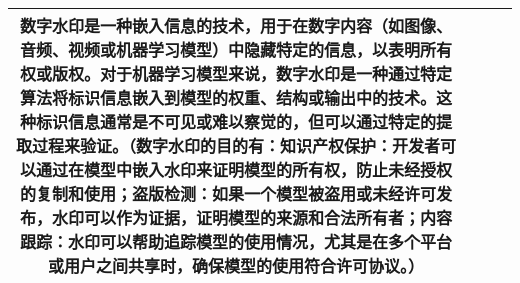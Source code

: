 \documentclass[lettersize,journal]{IEEEtran}
\begin{document}
\begin{longtable}{|c|p{3cm}|c|p{12cm}|}
   数字水印是一种嵌入信息的技术，用于在数字内容（如图像、音频、视频或机器学习模型）中隐藏特定的信息，以表明所有权或版权。对于机器学习模型来说，数字水印是一种通过特定算法将标识信息嵌入到模型的权重、结构或输出中的技术。这种标识信息通常是不可见或难以察觉的，但可以通过特定的提取过程来验证。（数字水印的目的有：知识产权保护：开发者可以通过在模型中嵌入水印来证明模型的所有权，防止未经授权的复制和使用；盗版检测：如果一个模型被盗用或未经许可发布，水印可以作为证据，证明模型的来源和合法所有者；内容跟踪：水印可以帮助追踪模型的使用情况，尤其是在多个平台或用户之间共享时，确保模型的使用符合许可协议。） \\ \hline
\end{longtable}



\end{document}
